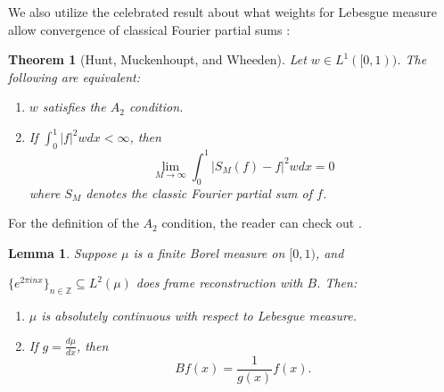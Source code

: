 \documentclass[11pt]{amsart}
\newtheorem*{thm*}{Theorem}
\newtheorem{lem}[thm]{Lemma}
\theoremstyle{definition}
\numberwithin{equation}{section}
\begin{document}
We also utilize the celebrated result about what weights for Lebesgue measure allow convergence of classical Fourier partial sums \cite{Hunt1973Weighted}:
\begin{thm*}[Hunt, Muckenhoupt, and Wheeden]\label{Mthm}
Let $w\in L^{1}([0,1))$. The following are equivalent:
\begin{enumerate}
    \item $w$ satisfies the $A_2$ condition.
    \item If $\int_{0}^{1}|f|^{2}wdx<\infty$, then
    $$\lim_{M\to \infty}\int_{0}^{1}|S_M(f)-f|^{2}wdx=0$$ where $S_{M}$ denotes the classic Fourier partial sum of $f$.
\end{enumerate}
\end{thm*}
For the definition of the $A_2$ condition, the reader can check out \cite{Hunt1973Weighted}.
\begin{lem}\label{almosta2}
Suppose $\mu$ is a finite Borel measure on $[0,1)$, and 

$\{ e^{2 \pi i n x} \}_{n \in \mathbb{Z}}\subseteq L^2(\mu)$ does frame reconstruction with $B$. Then:
\begin{enumerate}
    \item $\mu$ is absolutely continuous with respect to Lebesgue measure.
    \item If $g = \frac{d\mu}{dx}$, then
    \[
    B f(x) = \frac{1}{g(x)} f(x).
    \]
\end{enumerate}
\end{lem}
\end{document}
